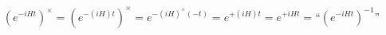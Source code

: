 \begin{equation}
\left( e^{-iHt}\right)^\times = \left( e^{- (iH) t}\right)^\times =
	e^{-(iH)^\times (-t)} = e^{+(iH)t} = e^{+iHt}
	= \textrm{``}\left( e^{-iHt}\right)^{-1}\textrm{''}
\label{eq:alttrad}
\end{equation}

